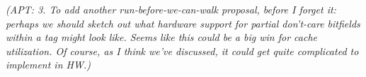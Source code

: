 \documentclass{article}
\newcommand{\apt}[1]{{\color{red}\em (APT: #1)}}
\begin{document}
\apt{3. To add another run-before-we-can-walk proposal, before I forget it:
perhaps we should sketch out what hardware support for partial don't-care
bitfields within a tag might look like. Seems like this could be a big win
for cache utilization. Of course, as I think we've discussed, it could get quite
complicated to implement in HW.}
\end{document}
